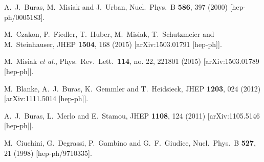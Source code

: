 \documentclass[prd,preprint,superscriptaddress,amsmath,amssymb]{revtex4}
\begin{document}
\begin{thebibliography}{100}
  A.~J.~Buras, M.~Misiak and J.~Urban,
  Nucl.\ Phys.\ B {\bf 586}, 397 (2000)
  [hep-ph/0005183].



  M.~Czakon, P.~Fiedler, T.~Huber, M.~Misiak, T.~Schutzmeier and M.~Steinhauser,
  JHEP {\bf 1504}, 168 (2015)
  [arXiv:1503.01791 [hep-ph]].




  M.~Misiak {\it et al.},
  Phys.\ Rev.\ Lett.\  {\bf 114}, no. 22, 221801 (2015)
  [arXiv:1503.01789 [hep-ph]].


  M.~Blanke, A.~J.~Buras, K.~Gemmler and T.~Heidsieck,
  JHEP {\bf 1203}, 024 (2012)
  [arXiv:1111.5014 [hep-ph]].
  
  A.~J.~Buras, L.~Merlo and E.~Stamou,
  JHEP {\bf 1108}, 124 (2011)
  [arXiv:1105.5146 [hep-ph]].


  
  M.~Ciuchini, G.~Degrassi, P.~Gambino and G.~F.~Giudice,
  Nucl.\ Phys.\ B {\bf 527}, 21 (1998)
  [hep-ph/9710335].
  

\end{thebibliography}
\end{document}
